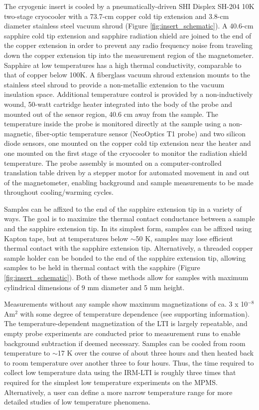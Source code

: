 \documentclass[draft,gc]{AGUTeX}
\begin{document}
\begin{article}
The cryogenic insert is cooled by a pneumatically-driven SHI Displex SH-204 10K two-stage cryocooler with a 73.7-cm copper cold tip extension and 3.8-cm diameter stainless steel vacuum shroud (Figure \ref{fig:insert_schematic}). A 40.6-cm sapphire cold tip extension and sapphire radiation shield are joined to the end of the copper extension in order to prevent any radio frequency noise from traveling down the copper extension tip into the measurement region of the magnetometer. Sapphire at low temperatures has a high thermal conductivity, comparable to that of copper below 100K. A fiberglass vacuum shroud extension mounts to the stainless steel shroud to provide a non-metallic extension to the vacuum insulation space. Additional temperature control is provided by a non-inductively wound, 50-watt cartridge heater integrated into the body of the probe and mounted out of the sensor region, 40.6 cm away from the sample. The temperature inside the probe is monitored directly at the sample using a non-magnetic, fiber-optic temperature sensor (NeoOptics T1 probe) and two silicon diode sensors, one mounted on the copper cold tip extension near the heater and one mounted on the first stage of the cryocooler to monitor the radiation shield temperature. The probe assembly is mounted on a computer-controlled translation table driven by a stepper motor for automated movement in and out of the magnetometer, enabling background and sample measurements to be made throughout cooling/warming cycles.

Samples can be affixed to the end of the sapphire extension tip in a variety of ways. The goal is to maximize the thermal contact conductance between a sample and the sapphire extension tip. In its simplest form, samples can be affixed using Kapton tape, but at temperatures below $\sim$50 K, samples may lose efficient thermal contact with the sapphire extension tip.  Alternatively, a threaded copper sample holder can be bonded to the end of the sapphire extension tip, allowing samples to be held in thermal contact with the sapphire (Figure \ref{fig:insert_schematic}). Both of these methods allow for samples with maximum cylindrical dimensions of 9 mm diameter and 5 mm height.

Measurements without any sample show maximum magnetizations of ca. 3 x 10$^{-8}$ Am$^2$ with some degree of temperature dependence (see supporting information). The temperature-dependent magnetization of the LTI is largely repeatable, and empty probe experiments are conducted prior to measurement runs to enable background subtraction if deemed necessary. Samples can be cooled from room temperature to $\sim$17 K over the course of about three hours and then heated back to room temperature over another three to four hours. Thus, the time required to collect low temperature data using the IRM-LTI is roughly three times that required for the simplest low temperature experiments on the MPMS.  Alternatively, a user can define a more narrow temperature range for more detailed studies of low temperature phenomena.  


\end{article}
\end{document}
